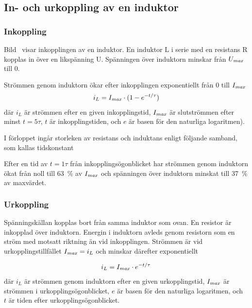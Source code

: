 \subsection{In- och urkoppling av en induktor}

\subsubsection{Inkoppling}


Bild~ visar inkopplingen av en induktor.
En induktor L i serie med en resistans R kopplas in över en likspänning U.
Spänningen över induktorn minskar från \(U_{\it max}\) till 0.

Strömmen genom induktorn ökar efter inkopplingen exponentiellt från 0 till \(I_{\it max}\)
%
\[i_L = I_{\it max} \cdot (1-e^{-t/\tau} )\]
%
där
\(i_L\) är strömmen efter en given inkopplingstid, 
\(I_{\it max}\) är slutströmmen efter minst \(t = 5\tau\),
\(t\) är inkopplingstiden, och
\(e\) är basen för den naturliga logaritmen).

I förloppet ingår storleken av resistans och induktans enligt följande samband,
som kallas tidskonstant
%
%

Efter en tid av \(t = 1\tau\) från inkopplingsögonblicket har strömmen genom
induktorn ökat från noll till \qty{63}{\percent} av \(I_{\it max}\) och
spänningen över induktorn minskat till \qty{37}{\percent} av maxvärdet.


\subsubsection{Urkoppling}
\label{induktor_urkoppling}

Spänningskällan kopplas bort från samma induktor som ovan.
En resistor är inkopplad över induktorn.
Energin i induktorn avleds genom resistorn som en ström med motsatt riktning än
vid inkopplingen.
Strömmen är vid urkopplingstillfället \(I_{\it max} = i_L\) och minskar därefter
exponentiellt

\[i_L = I_{\it max} \cdot e^{-t/\tau}\]
\noindent där
  \(i_L\) är strömmen genom induktorn efter en given ur\-kop\-p\-li\-ngs\-tid, 
  \(I_{\it max}\) är strömmen i urkopplingsögonblicket,
  \(e\) är basen för den naturliga logaritmen, och\
  \(t\) är tiden efter urkopplingsögonblicket.

